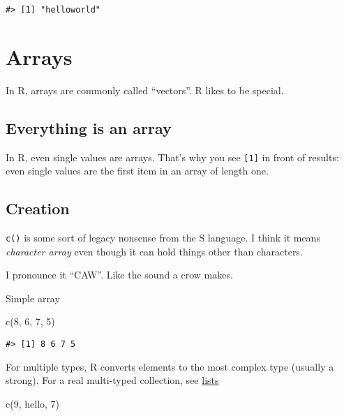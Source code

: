 \documentclass[
]{book}
\newenvironment{Shaded}{\begin{snugshade}}{\end{snugshade}}
\newcommand{\DecValTok}[1]{\textcolor[rgb]{0.00,0.00,0.81}{#1}}
\newcommand{\FunctionTok}[1]{\textcolor[rgb]{0.00,0.00,0.00}{#1}}
\newcommand{\NormalTok}[1]{#1}
\newcommand{\StringTok}[1]{\textcolor[rgb]{0.31,0.60,0.02}{#1}}
\begin{document}
\begin{verbatim}
#> [1] "helloworld"
\end{verbatim}

\hypertarget{arrays}{%
\chapter{Arrays}\label{arrays}}

In R, arrays are commonly called ``vectors''. R likes to be special.

\hypertarget{everything-is-an-array}{%
\section{Everything is an array}\label{everything-is-an-array}}

In R, even single values are arrays. That's why you see \texttt{{[}1{]}} in front of results: even single values are the first item in an array of length one.

\hypertarget{creation}{%
\section{Creation}\label{creation}}

\texttt{c()} is some sort of legacy nonsense from the S language. I think it means \emph{character array} even though it can hold things other than characters.

I pronounce it ``CAW''. Like the sound a crow makes.

Simple array

\begin{Shaded}
\begin{Highlighting}[]
\FunctionTok{c}\NormalTok{(}\DecValTok{8}\NormalTok{, }\DecValTok{6}\NormalTok{, }\DecValTok{7}\NormalTok{, }\DecValTok{5}\NormalTok{)}
\end{Highlighting}
\end{Shaded}

\begin{verbatim}
#> [1] 8 6 7 5
\end{verbatim}

For multiple types, R converts elements to the most complex type (usually a strong). For a real multi-typed collection, see \href{lists.html}{lists}

\begin{Shaded}
\begin{Highlighting}[]
\FunctionTok{c}\NormalTok{(}\DecValTok{9}\NormalTok{, }\StringTok{\textquotesingle{}hello\textquotesingle{}}\NormalTok{, }\DecValTok{7}\NormalTok{)}
\end{Highlighting}
\end{Shaded}
\end{document}
